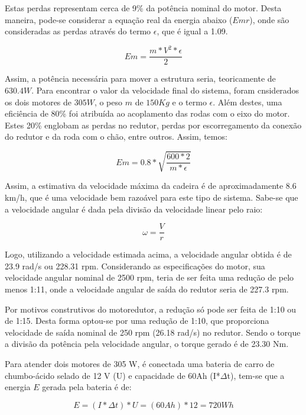 		Estas perdas representam cerca de 9\% da potência nominal do motor. Desta maneira, pode-se considerar a equação real da energia abaixo ($Emr$), onde são consideradas as perdas através do termo $\epsilon$, que é igual a 1.09.

		\begin{equation}
			Em = \frac{m*V^2*\epsilon}{2}
		\end{equation}

		Assim, a potência necessária para mover a estrutura seria, teoricamente de $630.4 W$. Para encontrar o valor da velocidade final do sistema, foram cnsiderados os dois motores de $305 W$, o peso $m$ de $150 Kg$ e o termo $\epsilon$. Além destes, uma eficiência de 80\% foi atribuída ao acoplamento das rodas com o eixo do motor. Estes 20\% englobam as perdas no redutor, perdas por escorregamento da conexão do redutor e da roda com o chão, entre outros. Assim, temos:

		\begin{equation}
			Em = 0.8*\sqrt{\frac{600*2}{m*\epsilon}}
		\end{equation}

		Assim, a estimativa da velocidade máxima da cadeira é de aproximadamente 8.6 km/h, que é uma velocidade bem razoável para este tipo de sistema. Sabe-se que a velocidade angular é dada pela divisão da velocidade linear pelo raio:

		\begin{equation}
			\omega = \frac{V}{r}
		\end{equation}

		Logo, utilizando a velocidade estimada acima, a velocidade angular obtida é de 23.9 rad/s ou 228.31 rpm. Considerando as especificações do motor, sua velocidade angular nominal de 2500 rpm, teria de ser feita uma redução de pelo menos 1:11, onde a velocidade angular de saída do redutor seria de 227.3 rpm.

		Por motivos construtivos do motoredutor, a redução só pode ser feita de 1:10 ou de 1:15. Desta forma optou-se por uma redução de 1:10, que proporciona velocidade de saída nominal de 250 rpm (26.18 rad/s) no redutor. Sendo o torque a divisão da potência pela velocidade angular, o torque gerado é de 23.30 Nm.

		Para atender dois motores de 305 W, é conectada uma bateria de carro de chumbo-ácido selado de 12 V (U) e capacidade de 60Ah (I*$\Delta$t), tem-se que a energia $E$ gerada pela bateria é de:

		\begin{equation}
			E = (I*\Delta t)*U = (60Ah)*12 = 720Wh
		\end{equation}

